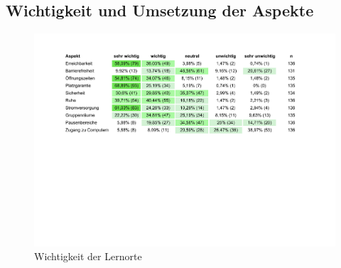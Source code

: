 \documentclass[11pt, a4paper]{article}
\begin{document}
\leavevmode
\newpage
\subsection{Wichtigkeit und Umsetzung der Aspekte}
\begin{figure}[htbp]
	\vspace*{6.8cm}
	\hspace*{-2.35cm}
	\includegraphics[scale = 0.79, trim=0.5cm 11cm 0.5cm 11cm]{Tabellen.pdf}
	\caption{Wichtigkeit der Lernorte}
\end{figure}
\end{document}

